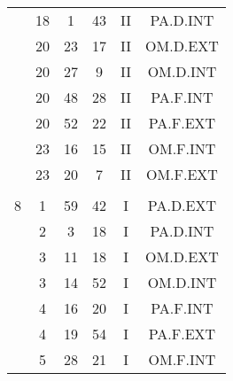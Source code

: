 \documentclass[12pt, a4paper]{article}
\begin{document}
\begin{multicols}{3}
{\begin{tabular}{c c c c c c}
	 	 	 	 & 18 & 1 & 43 & II & PA.D.INT\\%
	 	 	 	 & 20 & 23 & 17 & II & OM.D.EXT\\%
	 	 	 	 & 20 & 27 & 9 & II & OM.D.INT\\%
	 	 	 	 & 20 & 48 & 28 & II & PA.F.INT\\%
	 	 	 	 & 20 & 52 & 22 & II & PA.F.EXT\\%
	 	 	 	 & 23 & 16 & 15 & II & OM.F.INT\\%
	 	 	 	 & 23 & 20 & 7 & II & OM.F.EXT\\%
	 	 	 	 & & & & & \\%
	 	 	 	8 & 1 & 59 & 42 & I & PA.D.EXT\\%
	 	 	 	 & 2 & 3 & 18 & I & PA.D.INT\\%
	 	 	 	 & 3 & 11 & 18 & I & OM.D.EXT\\%
	 	 	 	 & 3 & 14 & 52 & I & OM.D.INT\\%
	 	 	 	 & 4 & 16 & 20 & I & PA.F.INT\\%
	 	 	 	 & 4 & 19 & 54 & I & PA.F.EXT\\%
	 	 	 	 & 5 & 28 & 21 & I & OM.F.INT\\%
	 	 \end{tabular}
 	}
\end{multicols}
\end{document}
